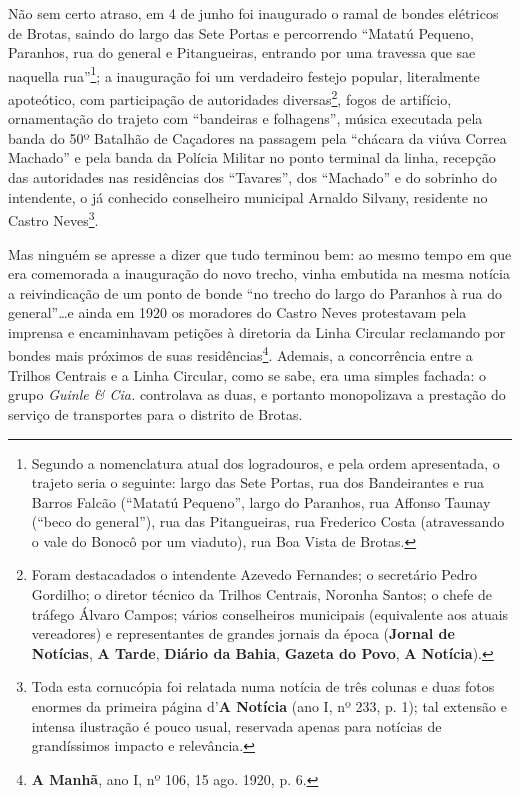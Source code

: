 Não sem certo atraso, em 4 de junho foi inaugurado o ramal de bondes elétricos de Brotas, saindo do largo das Sete Portas e percorrendo ``Matatú Pequeno, Paranhos, rua do general e Pitangueiras, entrando por uma travessa que sae naquella rua''\footnote{Segundo a nomenclatura atual dos logradouros, e pela ordem apresentada, o trajeto seria o seguinte: largo das Sete Portas, rua dos Bandeirantes e rua Barros Falcão (``Matatú Pequeno'', largo do Paranhos, rua Affonso Taunay (``beco do general''), rua das Pitangueiras, rua Frederico Costa (atravessando o vale do Bonocô por um viaduto), rua Boa Vista de Brotas.}; a inauguração foi um verdadeiro festejo popular, literalmente apoteótico, com participação de autoridades diversas\footnote{Foram destacadados o intendente Azevedo Fernandes; o secretário Pedro Gordilho; o diretor técnico da Trilhos Centrais, Noronha Santos; o chefe de tráfego Álvaro Campos; vários conselheiros municipais (equivalente aos atuais vereadores) e representantes de grandes jornais da época (\textbf{Jornal de Notícias}, \textbf{A Tarde}, \textbf{Diário da Bahia}, \textbf{Gazeta do Povo}, \textbf{A Notícia}).}, fogos de artifício, ornamentação do trajeto com  ``bandeiras e folhagens'', música executada pela banda do 50º Batalhão de Caçadores na passagem pela ``chácara da viúva Correa Machado'' e pela banda da Polícia Militar no ponto terminal da linha, recepção das autoridades nas residências dos ``Tavares'', dos ``Machado'' e do sobrinho do intendente, o já conhecido conselheiro municipal Arnaldo Silvany, residente no Castro Neves\footnote{Toda esta cornucópia foi relatada numa notícia de três colunas e duas fotos enormes da primeira página d'\textbf{A Notícia} (ano I, nº 233, p. 1); tal extensão e intensa ilustração é pouco usual, reservada apenas para notícias de grandíssimos impacto e relevância.}. 

Mas ninguém se apresse a dizer que tudo terminou bem: ao mesmo tempo em que era comemorada a inauguração do novo trecho, vinha embutida na mesma notícia a reivindicação de um ponto de bonde ``no trecho do largo do Paranhos à rua do general''\dots e ainda em 1920 os moradores do Castro Neves protestavam pela imprensa e encaminhavam petições à diretoria da Linha Circular reclamando por bondes mais próximos de suas residências\footnote{\textbf{A Manhã}, ano I, nº 106, 15 ago. 1920, p. 6.}. Ademais, a concorrência entre a Trilhos Centrais e a Linha Circular, como se sabe, era uma simples fachada: o grupo \textit{Guinle \& Cia.} controlava as duas, e portanto monopolizava a prestação do serviço de transportes para o distrito de Brotas.

